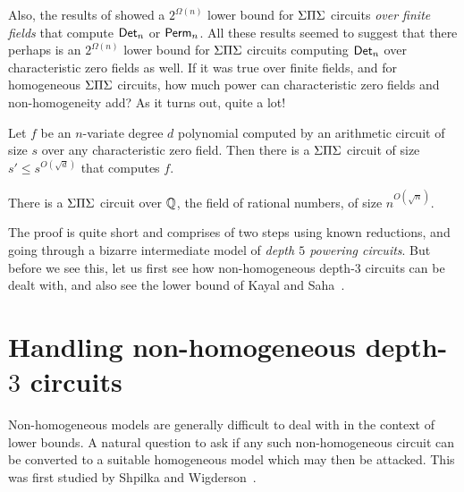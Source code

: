 Also, the results of \cite{gr00,grigoriev98} showed a $2^{\Omega(n)}$
lower bound for $\Sigma\Pi\Sigma$ circuits \emph{over finite fields} that compute
$\mathsf{Det}_n$ or $\mathsf{Perm}_n$.
All these results seemed to suggest that there perhaps is an
$2^{\Omega(n)}$ lower bound for $\Sigma\Pi\Sigma$ circuits computing $\mathsf{Det}_n$
over characteristic zero fields as well.
If it was true over finite fields, and for homogeneous $\Sigma\Pi\Sigma$
circuits, how much power can characteristic zero fields and
non-homogeneity add? 
As it turns out, quite a lot!

\begin{theorem} \label{thm:chasm-at-3} Let $f$ be an
  $n$-variate degree $d$ polynomial computed by an arithmetic circuit
  of size $s$ over any characteristic zero field.
  Then there is a $\Sigma\Pi\Sigma$ circuit of size $s' \leq s^{O(\sqrt{d})}$
  that computes $f$. 
\end{theorem}
\begin{corollary}\label{cor:det-sps}
There is a $\Sigma\Pi\Sigma$ circuit over $\mathbb{Q}$, the field of rational numbers, of size $n^{O(\sqrt{n})}$. 
\end{corollary}


The proof is quite short and comprises of two steps using known
reductions, and going through a bizarre intermediate model of
\emph{depth $5$ powering circuits}.
But before we see this, let us first see how non-homogeneous depth-$3$
circuits can be dealt with, and also see the lower bound of Kayal and
Saha~\cite{KayalSaha14}. 


\section{Handling non-homogeneous depth-$3$ circuits}\label{sec:non-hom-d3}

Non-homogeneous models are generally difficult to deal with in the
context of lower bounds.
A natural question to ask if any such non-homogeneous circuit can be
converted to a suitable homogeneous model which may then be attacked.
This was first studied by Shpilka and Wigderson~\cite{sw2001}. \\

